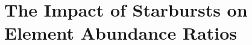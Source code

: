 \documentclass[../main.tex]{subfiles}
\begin{document}
\chapter{The Impact of Starbursts on Element Abundance Ratios}
\label{bursts}








\end{document}
